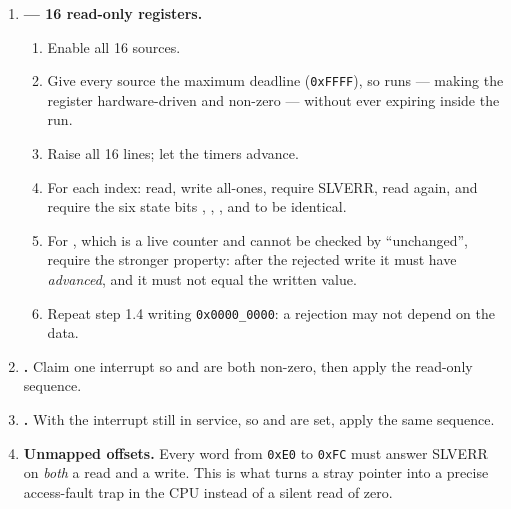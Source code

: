 \begin{enumerate}[leftmargin=*,itemsep=4pt]

\item[\textbf{1}] \textbf{ --- 16 read-only registers.}
\begin{enumerate}[label=1.\arabic*,leftmargin=12mm,itemsep=1pt]
  \item Enable all 16 sources.
  \item Give every source the maximum deadline (\texttt{0xFFFF}), so
         runs --- making the register hardware-driven and
        non-zero --- without ever expiring inside the run.
  \item Raise all 16 lines; let the timers advance.
  \item For each index: read, write all-ones, require SLVERR, read again, and
        require the six state bits , , ,
         and  to be identical.
  \item For , which is a live counter and cannot be checked by
        ``unchanged'', require the stronger property: after the rejected write
        it must have \emph{advanced}, and it must not equal the written value.
  \item Repeat step 1.4 writing \texttt{0x0000\_0000}: a rejection may not
        depend on the data.
\end{enumerate}

\item[\textbf{2}] \textbf{.} Claim one interrupt so
 and  are both non-zero, then apply the read-only
sequence.

\item[\textbf{3}] \textbf{.} With the interrupt still in
service, so  and  are set, apply the same sequence.

\item[\textbf{4}] \textbf{Unmapped offsets.} Every word from \texttt{0xE0} to
\texttt{0xFC} must answer SLVERR on \emph{both} a read and a write. This is what
turns a stray pointer into a precise access-fault trap in the CPU instead of a
silent read of zero.


\end{enumerate}
